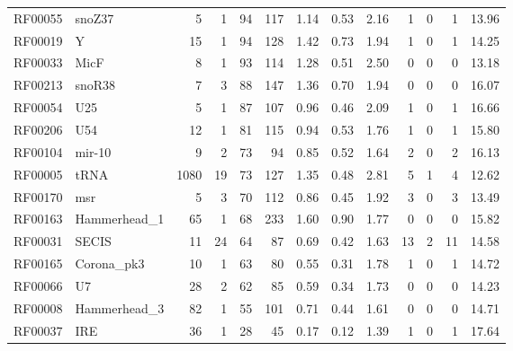 \begin{table}
\begin{center}
\begin{tabular}{|ll|rr|rr|r|rr|rrrr|}
RF00055 & snoZ37          &     5 &     1 &    94 & 117 &   1.14 &   0.53 &   2.16 &   1 &  0 &  1 &  13.96 \\
RF00019 & Y               &    15 &     1 &    94 & 128 &   1.42 &   0.73 &   1.94 &   1 &  0 &  1 &  14.25 \\
RF00033 & MicF            &     8 &     1 &    93 & 114 &   1.28 &   0.51 &   2.50 &   0 &  0 &  0 &  13.18 \\
RF00213 & snoR38          &     7 &     3 &    88 & 147 &   1.36 &   0.70 &   1.94 &   0 &  0 &  0 &  16.07 \\
RF00054 & U25             &     5 &     1 &    87 & 107 &   0.96 &   0.46 &   2.09 &   1 &  0 &  1 &  16.66 \\
RF00206 & U54             &    12 &     1 &    81 & 115 &   0.94 &   0.53 &   1.76 &   1 &  0 &  1 &  15.80 \\
RF00104 & mir-10          &     9 &     2 &    73 &  94 &   0.85 &   0.52 &   1.64 &   2 &  0 &  2 &  16.13 \\
RF00005 & tRNA            &  1080 &    19 &    73 & 127 &   1.35 &   0.48 &   2.81 &   5 &  1 &  4 &  12.62 \\
RF00170 & msr             &     5 &     3 &    70 & 112 &   0.86 &   0.45 &   1.92 &   3 &  0 &  3 &  13.49 \\
RF00163 & Hammerhead\_1   &    65 &     1 &    68 & 233 &   1.60 &   0.90 &   1.77 &   0 &  0 &  0 &  15.82 \\
RF00031 & SECIS           &    11 &    24 &    64 &  87 &   0.69 &   0.42 &   1.63 &  13 &  2 & 11 &  14.58 \\
RF00165 & Corona\_pk3     &    10 &     1 &    63 &  80 &   0.55 &   0.31 &   1.78 &   1 &  0 &  1 &  14.72 \\
RF00066 & U7              &    28 &     2 &    62 &  85 &   0.59 &   0.34 &   1.73 &   0 &  0 &  0 &  14.23 \\
RF00008 & Hammerhead\_3   &    82 &     1 &    55 & 101 &   0.71 &   0.44 &   1.61 &   0 &  0 &  0 &  14.71 \\
RF00037 & IRE             &    36 &     1 &    28 &  45 &   0.17 &   0.12 &   1.39 &   1 &  0 &  1 &  17.64 \\ \hline

\end{tabular}
\end{center}
\end{table}
